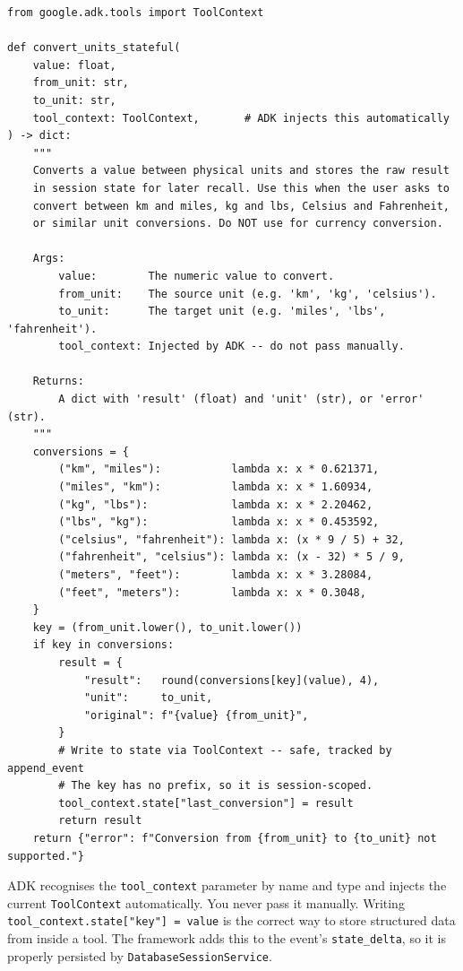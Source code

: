 \documentclass[12pt, a4paper]{article}
\begin{document}
\begin{practicalbox}
\begin{lstlisting}[style=pythonstyle, caption={Saving structured data from inside a tool via ToolContext}]
from google.adk.tools import ToolContext

def convert_units_stateful(
    value: float,
    from_unit: str,
    to_unit: str,
    tool_context: ToolContext,       # ADK injects this automatically
) -> dict:
    """
    Converts a value between physical units and stores the raw result
    in session state for later recall. Use this when the user asks to
    convert between km and miles, kg and lbs, Celsius and Fahrenheit,
    or similar unit conversions. Do NOT use for currency conversion.

    Args:
        value:        The numeric value to convert.
        from_unit:    The source unit (e.g. 'km', 'kg', 'celsius').
        to_unit:      The target unit (e.g. 'miles', 'lbs', 'fahrenheit').
        tool_context: Injected by ADK -- do not pass manually.

    Returns:
        A dict with 'result' (float) and 'unit' (str), or 'error' (str).
    """
    conversions = {
        ("km", "miles"):           lambda x: x * 0.621371,
        ("miles", "km"):           lambda x: x * 1.60934,
        ("kg", "lbs"):             lambda x: x * 2.20462,
        ("lbs", "kg"):             lambda x: x * 0.453592,
        ("celsius", "fahrenheit"): lambda x: (x * 9 / 5) + 32,
        ("fahrenheit", "celsius"): lambda x: (x - 32) * 5 / 9,
        ("meters", "feet"):        lambda x: x * 3.28084,
        ("feet", "meters"):        lambda x: x * 0.3048,
    }
    key = (from_unit.lower(), to_unit.lower())
    if key in conversions:
        result = {
            "result":   round(conversions[key](value), 4),
            "unit":     to_unit,
            "original": f"{value} {from_unit}",
        }
        # Write to state via ToolContext -- safe, tracked by append_event
        # The key has no prefix, so it is session-scoped.
        tool_context.state["last_conversion"] = result
        return result
    return {"error": f"Conversion from {from_unit} to {to_unit} not supported."}
\end{lstlisting}

\begin{notebox}
ADK recognises the \texttt{tool\_context} parameter by name and type and injects
the current \texttt{ToolContext} automatically. You never pass it manually.
Writing \texttt{tool\_context.state["key"] = value} is the correct way to store
structured data from inside a tool. The framework adds this to the event's
\texttt{state\_delta}, so it is properly persisted by \texttt{DatabaseSessionService}.
\end{notebox}


\end{practicalbox}
\end{document}
